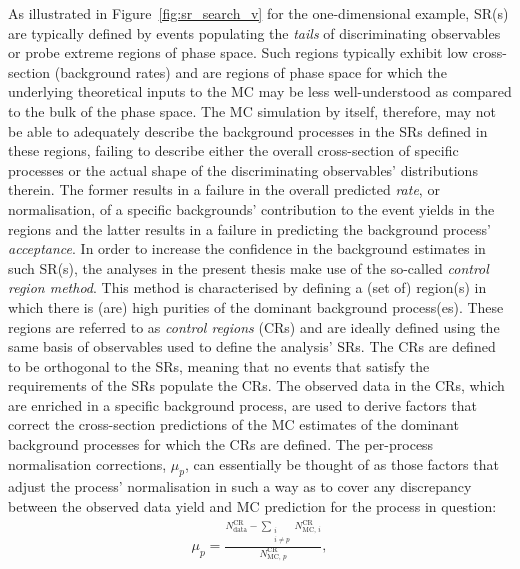 As illustrated in Figure~\ref{fig:sr_search_v} for the one-dimensional example,
SR(s) are typically defined by events populating the \textit{tails} of discriminating
observables or probe extreme regions of phase space.
Such regions typically exhibit low cross-section (background rates) and
are regions of phase space for which the underlying theoretical inputs
to the MC may be less well-understood as compared to the bulk of the phase space.
The MC simulation by itself, therefore, may not be able to adequately describe the background
processes in the SRs defined in these regions, failing to describe
either the overall cross-section of specific processes or the actual shape of the discriminating observables' distributions
therein.
The former results in a failure in the overall predicted \textit{rate}, or normalisation, of a specific backgrounds' contribution
to the event yields in the regions
and the latter results in a failure in predicting the background process' \textit{acceptance}.
In order to increase the confidence in the background estimates in such SR(s), the analyses in the present
thesis make use of the so-called \textit{control region method}.
This method is characterised by defining a (set of) region(s) in which there is (are) high purities
of the dominant background process(es).
These regions are referred to as \textit{control regions} (CRs) and are ideally defined using the
same basis of observables used to define the analysis' SRs.
The CRs are defined to be orthogonal to the SRs, meaning that no events that satisfy the requirements of
the SRs populate the CRs.
The observed data in the CRs, which are enriched in a specific background process, are used to derive
factors that correct the cross-section predictions of the MC estimates of the dominant background processes for
which the CRs are defined.
The per-process normalisation corrections, $\mu_p$, can essentially be thought of as those factors
that adjust the process' normalisation in such a way as to cover any discrepancy between the observed
data yield and MC prediction for the process in question:
\begin{align}
    \mu_{p} = \frac{  N_{\text{data}}^{\text{CR}} - \sum\limits_{\substack{i \\ i\ne p}} N_{\text{MC},\,i}^{\text{CR}}} { N_{\text{MC},\,p}^{\text{CR}}},
    \label{eq:mu_fac}
\end{align}
